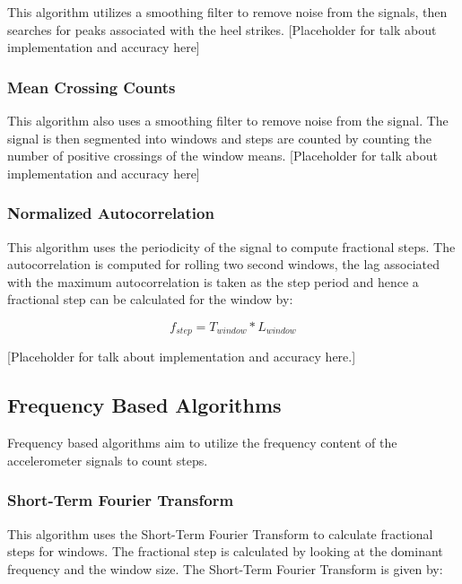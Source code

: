                     This algorithm utilizes a smoothing filter to remove noise from the signals, then searches for peaks associated with the heel strikes. [Placeholder for talk about implementation and accuracy here]

                \subsubsection{Mean Crossing Counts}

                    This algorithm also uses a smoothing filter to remove noise from the signal. The signal is then segmented into windows and steps are counted by counting the number of positive crossings of the window means. [Placeholder for talk about implementation and accuracy here]

                \subsubsection{Normalized Autocorrelation}

                    This algorithm uses the periodicity of the signal to compute fractional steps. The autocorrelation is computed for rolling two second windows, the lag associated with the maximum autocorrelation is taken as the step period and hence a fractional step can be calculated for the window by:

                    \begin{equation}
                        f_{step} = T_{window} * L_{window}
                    \end{equation}

                    [Placeholder for talk about implementation and accuracy here.]
            \subsection{Frequency Based Algorithms}

                Frequency based algorithms aim to utilize the frequency content of the accelerometer signals to count steps.

                \subsubsection{Short-Term Fourier Transform}

                    This algorithm uses the Short-Term Fourier Transform to calculate fractional steps for windows. The fractional step is calculated by looking at the dominant frequency and the window size. The Short-Term Fourier Transform is given by:

